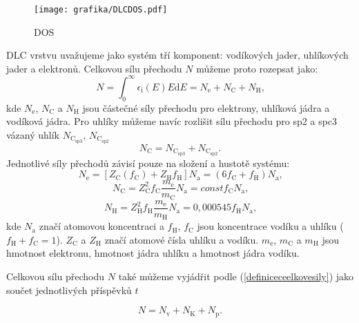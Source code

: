\begin{figure}[h]
\centering
\texttt{[image: grafika/DLCDOS.pdf]}
\caption{DOS}
\label{DLCDOS}
\end{figure} 

DLC vrstvu uvažujeme jako systém tří komponent: vodíkových jader, uhlíkových jader a elektronů. Celkovou sílu přechodu $N$ můžeme proto rozepsat jako:
\begin{equation}
N = \int_0^\infty \epsilon_\mathrm{i}(E) E \mathrm{d}E = N_\mathrm{e} + N_\mathrm{C} + N_\mathrm{H} \text{,}
\end{equation} 
kde $N_\mathrm{e}$, $N_\mathrm{C}$ a $N_\mathrm{H}$ jsou částečné síly přechodu pro elektrony, uhlíková jádra a vodíková jádra. Pro uhlíky můžeme navíc rozlišit sílu přechodu pro sp2 a spc3 vázaný uhlík $N_\mathrm{C_{sp3}}$, $N_\mathrm{C_{sp2}}$
\begin{equation}
N_\mathrm{C} = N_\mathrm{C_{sp3}} + N_\mathrm{C_{sp2}} \text{.}
\end{equation} 
Jednotlivé síly přechodů závisí pouze na složení a hustotě systému:
\begin{equation}
N_\mathrm{e} = [Z_\mathrm{C}(f_\mathrm{C}) + Z_\mathrm{H} f_\mathrm{H}] N_\mathrm{a} = (6f_\mathrm{C} + f_\mathrm{H})N_\mathrm{a} \text{,}
\end{equation}
\begin{equation}
N_\mathrm{C} = Z^2_\mathrm{C} f_\mathrm{C} \frac{m_\mathrm{e}}{m_\mathrm{C}} N_\mathrm{a} = const f_\mathrm{C} N_\mathrm{a} \text{,}
\end{equation}
\begin{equation}
N_\mathrm{H} = Z^2_\mathrm{H} f_\mathrm{H} \frac{m_\mathrm{e}}{m_\mathrm{H}} N_\mathrm{a} = 0,000545 f_\mathrm{H} N_\mathrm{a} \text{,}
\end{equation}
kde $N_\mathrm{a}$ značí atomovou koncentraci a $f_\mathrm{H}$, $f_\mathrm{C}$ jsou koncentrace vodíku a uhlíku ($f_\mathrm{H} + f_\mathrm{C} = 1 $). $Z_\mathrm{C}$ a $Z_\mathrm{H}$ značí atomové čísla uhlíku a vodíku. $m_\mathrm{e}$, $m_\mathrm{C}$ a $m_\mathrm{H}$ jsou hmotnost elektronu, hmotnost jádra uhlíku a hmotnost jádra vodíku. 

Celkovou sílu přechodu $N$ také můžeme vyjádřit podle (\ref{definiceceelkovesily}) jako součet jednotlivých příspěvků $t$

\begin{equation}
N = N_\mathrm{v} + N_\mathrm{K} + N_\mathrm{p} \text{.}
\end{equation}

